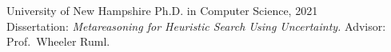 \documentclass[margin, 10pt]{res} %
\begin{document}
\begin{resume}
{\sc University of New Hampshire} \hfill Ph.D. in Computer Science, 2021\\
Dissertation: {\sl Metareasoning for Heuristic Search Using Uncertainty.} Advisor: Prof.\ Wheeler Ruml.\\~\\



\end{resume}
\end{document}
